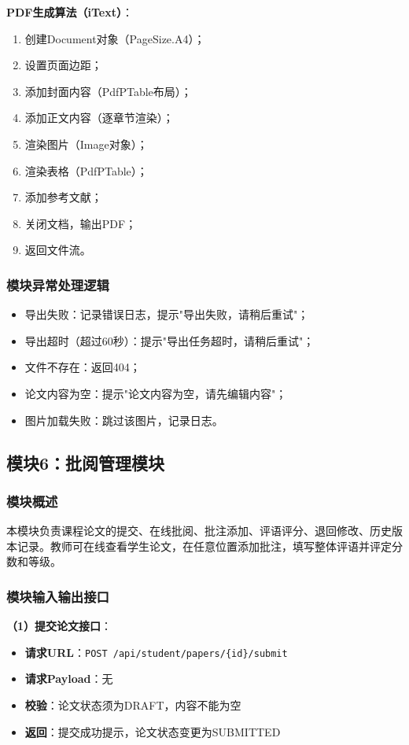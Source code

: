 \documentclass{../template/softeng}
\begin{document}
	\textbf{PDF生成算法（iText）}：
	\begin{enumerate}
		\item 创建Document对象（PageSize.A4）；
		\item 设置页面边距；
		\item 添加封面内容（PdfPTable布局）；
		\item 添加正文内容（逐章节渲染）；
		\item 渲染图片（Image对象）；
		\item 渲染表格（PdfPTable）；
		\item 添加参考文献；
		\item 关闭文档，输出PDF；
		\item 返回文件流。
	\end{enumerate}

	\subsubsection{模块异常处理逻辑}
	\begin{itemize}
		\item 导出失败：记录错误日志，提示"导出失败，请稍后重试"；
		\item 导出超时（超过60秒）：提示"导出任务超时，请稍后重试"；
		\item 文件不存在：返回404；
		\item 论文内容为空：提示"论文内容为空，请先编辑内容"；
		\item 图片加载失败：跳过该图片，记录日志。
	\end{itemize}

	\subsection{模块6：批阅管理模块}

	\subsubsection{模块概述}
	本模块负责课程论文的提交、在线批阅、批注添加、评语评分、退回修改、历史版本记录。教师可在线查看学生论文，在任意位置添加批注，填写整体评语并评定分数和等级。

	\subsubsection{模块输入输出接口}

	\textbf{（1）提交论文接口}：
	\begin{itemize}
		\item \textbf{请求URL}：\texttt{POST /api/student/papers/\{id\}/submit}
		\item \textbf{请求Payload}：无
		\item \textbf{校验}：论文状态须为DRAFT，内容不能为空
		\item \textbf{返回}：提交成功提示，论文状态变更为SUBMITTED
	\end{itemize}
\end{document}
